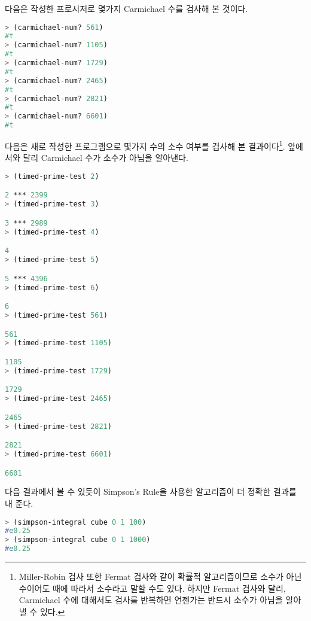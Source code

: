 다음은 작성한 프로시저로 몇가지 Carmichael 수를 검사해 본 것이다.

\begin{lstlisting}[language=Scheme]
> (carmichael-num? 561)
#t
> (carmichael-num? 1105)
#t
> (carmichael-num? 1729)
#t
> (carmichael-num? 2465)
#t
> (carmichael-num? 2821)
#t
> (carmichael-num? 6601)
#t
\end{lstlisting}


다음은 새로 작성한 프로그램으로 몇가지 수의 소수 여부를 검사해 본
결과이다\footnote{Miller-Robin 검사 또한 Fermat 검사와 같이 확률적
  알고리즘이므로 소수가 아닌 수이어도 때에 따라서 소수라고 말할 수도
  있다. 하지만 Fermat 검사와 달리, Carmichael 수에 대해서도 검사를
  반복하면 언젠가는 반드시 소수가 아님을 알아낼 수 있다.}. 앞에서와
달리 Carmichael 수가 소수가 아님을 알아낸다.

\begin{lstlisting}[language=Scheme]
> (timed-prime-test 2)

2 *** 2399
> (timed-prime-test 3)

3 *** 2989
> (timed-prime-test 4)

4
> (timed-prime-test 5)

5 *** 4396
> (timed-prime-test 6)

6
> (timed-prime-test 561)

561
> (timed-prime-test 1105)

1105
> (timed-prime-test 1729)

1729
> (timed-prime-test 2465)

2465
> (timed-prime-test 2821)

2821
> (timed-prime-test 6601)

6601
\end{lstlisting}


다음 결과에서 볼 수 있듯이 Simpson's Rule을 사용한 알고리즘이 더 정확한 결과를
내 준다.

\begin{lstlisting}[language=Scheme]
> (simpson-integral cube 0 1 100)
#e0.25
> (simpson-integral cube 0 1 1000)
#e0.25
\end{lstlisting}


